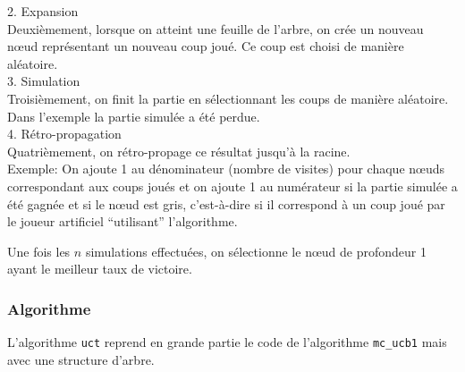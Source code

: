 \documentclass[a4paper]{article}
\theoremstyle{definition}
\begin{document}
2. Expansion\\
Deuxièmement, lorsque on atteint une feuille de l'arbre, on crée un nouveau nœud représentant un nouveau coup joué. Ce coup est choisi de manière aléatoire.\\

3. Simulation\\
Troisièmement, on finit la partie en sélectionnant les coups de manière aléatoire. Dans l'exemple la partie simulée a été perdue.\\

4. Rétro-propagation\\
Quatrièmement, on rétro-propage ce résultat jusqu'à la racine.\\
Exemple: On ajoute 1 au dénominateur (nombre de visites) pour chaque nœuds correspondant aux coups joués et on ajoute 1 au numérateur si la partie simulée a été gagnée et si le nœud est gris, c'est-à-dire si il correspond à un coup joué par le joueur artificiel ``utilisant'' l'algorithme.

Une fois les $n$ simulations effectuées, on sélectionne le nœud de profondeur 1 ayant le meilleur taux de victoire.

\subsubsection{Algorithme}

L'algorithme \texttt{uct} reprend en grande partie le code de l'algorithme \texttt{mc\_ucb1} mais avec une structure d'arbre.
\end{document}
